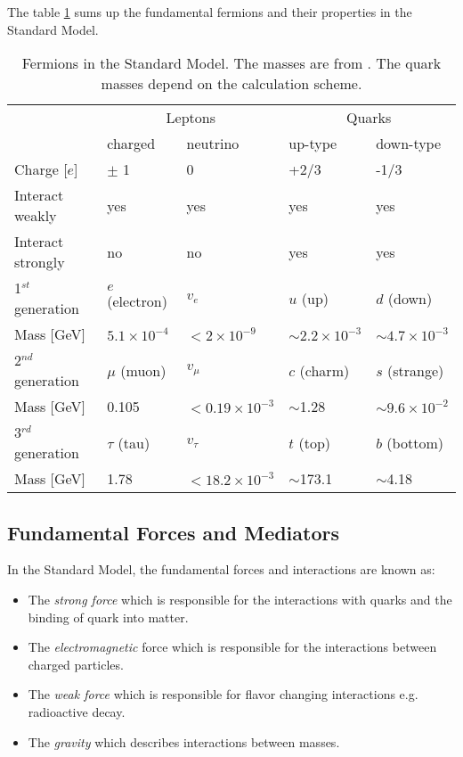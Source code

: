 The table \ref{table:Fermions} sums up the fundamental fermions and their properties in the Standard Model.

\begin{table}[htb!]
  \centering
  \caption{Fermions in the Standard Model. The masses are from \cite{Patrignani:2016xqp}. The quark masses depend on the calculation scheme.}
  \label{table:Fermions}
  \begin{tabular}{@{}lllll@{}} \toprule
    & \multicolumn{2}{c}{Leptons} & \multicolumn{2}{c}{Quarks} \\ \cmidrule(r){2-5}
    & charged & neutrino & up-type & down-type \\ \midrule
    Charge [$e$] & $\pm$ 1 & 0 & +2/3 & -1/3 \\
    Interact weakly & yes & yes & yes & yes \\
    Interact strongly & no & no & yes & yes \\ \midrule
    1$^{st}$ generation & $e$ (electron) & $v_e$ & $u$ (up) & $d$ (down) \\
    Mass [GeV] & $5.1 \times 10^{-4}$ & $< 2 \times 10^{-9}$ & $\sim 2.2 \times 10^{-3}$ & $\sim 4.7 \times 10^{-3}$\\ \midrule
    2$^{nd}$ generation & $\mu$ (muon) & $v_{\mu}$ & $c$ (charm) & $s$ (strange) \\
    Mass [GeV] & 0.105 & $< 0.19 \times 10^{-3}$ & $\sim$1.28 & $\sim 9.6 \times 10^{-2}$\\ \midrule
    3$^{rd}$ generation & $\tau$ (tau) & $v_{\tau}$ & $t$ (top) & $b$ (bottom) \\
    Mass [GeV] & 1.78 & $< 18.2 \times 10^{-3}$ & $\sim$173.1 & $\sim$4.18\\
    \bottomrule
  \end{tabular}
\end{table}

\subsection{Fundamental Forces and Mediators}
\label{subsec:Mediators}

In the Standard Model, the fundamental forces and interactions are known as:
\begin{itemize}
  \item The \textit{strong force} which is responsible for the interactions with quarks and the binding of quark into matter.
  \item The \textit{electromagnetic} force which is responsible for the interactions between charged particles.
  \item The \textit{weak force} which is responsible for flavor changing interactions e.g. radioactive decay.
  \item The \textit{gravity} which describes interactions between masses.
\end{itemize}

